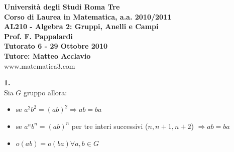 \documentclass[italian,a4paper,11pt]
{article}
\begin{document}
\begin{center}

\textbf{Universit\`a degli Studi Roma Tre}\\

\textbf{Corso di Laurea in Matematica, a.a. 2010/2011}\\

\textbf{AL210 - Algebra 2: Gruppi, Anelli e Campi}\\

\textbf{Prof. F. Pappalardi}\\

\textbf{Tutorato 6 - 29	 Ottobre 2010}\\

\textbf{Tutore: Matteo Acclavio}\\

www.matematica3.com\\
\end{center}

\vspace{0.1cm}
\noindent
\begin{Ex}\textbf{ 1.}\\
Sia $G$ gruppo allora:
\begin{itemize}
\item se $a^2b^2=(ab)^2 \Rightarrow ab=ba$
\item se $a^nb^n=(ab)^n $ per tre interi successivi ($n,n+1,n+2$) $\Rightarrow ab=ba$
\item $o(ab)=o(ba) \forall a,b\in G$
\end{itemize}
\end{Ex}
\end{document}

